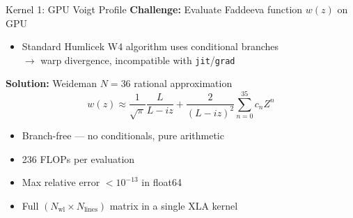 \documentclass[aspectratio=169,10pt]{beamer}
\begin{document}
\begin{frame}{Kernel 1: GPU Voigt Profile}
	\textbf{Challenge:} Evaluate Faddeeva function $w(z)$ on GPU
	\begin{itemize}
		\item Standard Humlicek W4 algorithm uses conditional branches\\
		      $\to$ warp divergence, incompatible with \texttt{jit}/\texttt{grad}
	\end{itemize}

	\vspace{0.5em}
	\textbf{Solution:} Weideman $N\!=\!36$ rational approximation
	\begin{equation*}
		w(z) \approx \frac{1}{\sqrt{\pi}} \frac{L}{L - iz}
		  + \frac{2}{(L - iz)^2} \sum_{n=0}^{35} c_n Z^n
	\end{equation*}

	\begin{itemize}
		\item \alert{Branch-free} --- no conditionals, pure arithmetic
		\item 236 FLOPs per evaluation
		\item Max relative error $< 10^{-13}$ in float64
		\item Full $(N_\text{wl} \times N_\text{lines})$ matrix in a single XLA kernel
	\end{itemize}
\end{frame}
\end{document}

